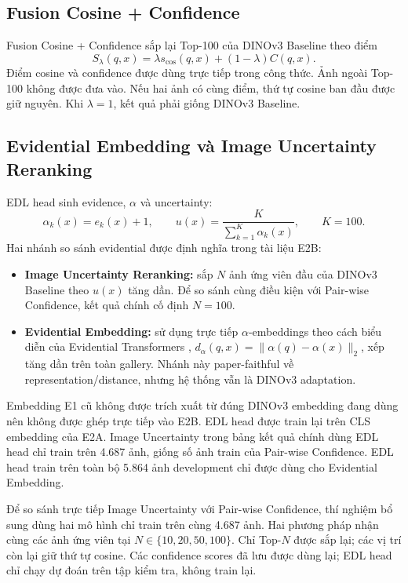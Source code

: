 \documentclass[11pt,a4paper]{article}
\begin{document}
\subsection{Fusion Cosine + Confidence}
Fusion Cosine + Confidence sắp lại Top-100 của DINOv3 Baseline theo điểm
\begin{equation}
 S_{\lambda}(q,x)=\lambda s_{\cos}(q,x)+(1-\lambda)C(q,x).
\end{equation}
Điểm cosine và confidence được dùng trực tiếp trong công thức. Ảnh ngoài
Top-100 không được đưa vào. Nếu hai ảnh có cùng điểm, thứ tự cosine ban đầu
được giữ nguyên. Khi $\lambda=1$, kết quả phải giống DINOv3 Baseline.

\subsection{Evidential Embedding và Image Uncertainty Reranking}
EDL head sinh evidence, $\alpha$ và uncertainty:
\begin{equation}
 \alpha_k(x)=e_k(x)+1,\qquad
 u(x)=\frac{K}{\sum_{k=1}^{K}\alpha_k(x)},\qquad K=100.
\end{equation}
Hai nhánh so sánh evidential được định nghĩa trong tài liệu E2B:
\begin{itemize}
 \item \textbf{Image Uncertainty Reranking:} sắp $N$ ảnh ứng viên đầu của
 DINOv3 Baseline theo $u(x)$ tăng dần. Để so sánh cùng điều kiện với
 Pair-wise Confidence, kết quả chính cố định $N=100$.
 \item \textbf{Evidential Embedding:} sử dụng trực tiếp $\alpha$-embeddings theo
 cách biểu diễn của Evidential Transformers \cite{dordevic2024evidential},
 $d_{\alpha}(q,x)=\lVert\alpha(q)-\alpha(x)\rVert_2$, xếp tăng dần trên toàn
 gallery. Nhánh này paper-faithful về representation/distance, nhưng
 hệ thống vẫn là DINOv3 adaptation.
\end{itemize}
Embedding E1 cũ không được trích xuất từ đúng DINOv3 embedding đang dùng nên
không được ghép trực tiếp vào E2B. EDL head được train lại trên CLS embedding
của E2A. Image Uncertainty trong bảng kết quả chính dùng EDL head chỉ train
trên 4.687 ảnh, giống số ảnh train của Pair-wise Confidence. EDL head train
trên toàn bộ 5.864 ảnh development chỉ được dùng cho Evidential Embedding.

Để so sánh trực tiếp Image Uncertainty với Pair-wise Confidence, thí nghiệm
bổ sung dùng hai mô hình chỉ train trên cùng 4.687 ảnh. Hai phương pháp nhận
cùng các ảnh ứng viên tại $N\in\{10,20,50,100\}$. Chỉ Top-$N$ được sắp lại;
các vị trí còn lại giữ thứ tự cosine. Các confidence scores đã lưu được dùng
lại; EDL head chỉ chạy dự đoán trên tập kiểm tra, không train lại.
\end{document}
